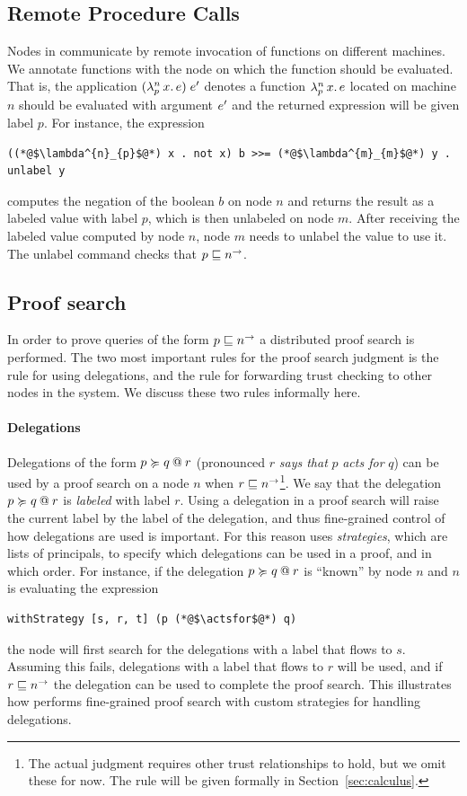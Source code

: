 \subsection{Remote Procedure Calls}
Nodes in \lang{} communicate by remote invocation of functions on different machines. We annotate functions with the node on which the function should be evaluated. That is, the application $\app{(\abs{n}{p}{x}{\expr})}{\expr'}$ denotes a function $\abs{n}{p}{x}{\expr}$ located on machine $n$ should be evaluated with argument $\expr'$ and the returned expression will be given label $p$. For instance, the expression
\begin{lstlisting}
((*@$\lambda^{n}_{p}$@*) x . not x) b >>= (*@$\lambda^{m}_{m}$@*) y . unlabel y
\end{lstlisting}
computes the negation of the boolean $b$ on node $n$ and returns the result as a labeled value with label $p$, which is then unlabeled on node $m$. After receiving the labeled value computed by node $n$, node $m$ needs to unlabel the value to use it. The unlabel command checks that $p \flowsto \conf{n}$.

\subsection{Proof search}
In order to prove queries of the form $p \flowsto \conf{n}$ a distributed proof search is performed. The two most important rules for the proof search judgment is the rule for using delegations, and the rule for forwarding trust checking to other nodes in the system. We discuss these two rules informally here.

\paragraph{Delegations}
Delegations of the form $\lb{r}{p \actsfor q}$ (pronounced $r$ \emph{says that} $p$ \emph{acts for} $q$) can be used by a proof search on a node $n$ when $r \flowsto \conf{n}$\footnote{The actual judgment requires other trust relationships to hold, but we omit these for now. The rule will be given formally in Section~\ref{sec:calculus}.}. We say that the delegation $\lb{r}{p \actsfor q}$ is \emph{labeled} with label $r$. Using a delegation in a proof search will raise the current label by the label of the delegation, and thus fine-grained control of how delegations are used is important. For this reason \lang{} uses \emph{strategies}, which are lists of principals, to specify which delegations can be used in a proof, and in which order. For instance, if the delegation $\lb{r}{p \actsfor q}$ is ``known'' by node $n$ and $n$ is evaluating the expression
\begin{lstlisting}
withStrategy [s, r, t] (p (*@$\actsfor$@*) q)
\end{lstlisting}
the node will first search for the delegations with a label that flows to $s$. Assuming this fails, delegations with a label that flows to $r$ will be used, and if $r \flowsto \conf{n}$ the delegation can be used to complete the proof search. This illustrates how \lang{} performs fine-grained proof search with custom strategies for handling delegations.

